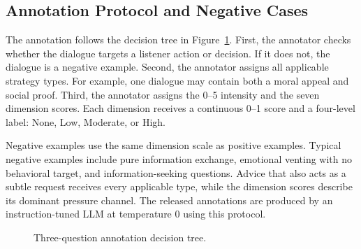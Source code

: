 \documentclass[conference]{IEEEtran}
\begin{document}
\subsection{Annotation Protocol and Negative Cases}
The annotation follows the decision tree in Figure~\ref{fig:tree}. First,
the annotator checks whether the dialogue targets a listener action or
decision. If it does not, the dialogue is a negative example. Second, the
annotator assigns all applicable strategy types. For example, one dialogue may
contain both a moral appeal and social proof. Third, the annotator assigns the
0--5 intensity and the seven dimension scores. Each dimension receives a
continuous 0--1 score and a four-level label: None, Low, Moderate, or High.

Negative examples use the same dimension scale as positive examples. Typical
negative examples include pure information exchange, emotional venting with
no behavioral target, and information-seeking questions. Advice that also
acts as a subtle request receives every applicable type, while the dimension
scores describe its dominant pressure channel. The released annotations are
produced by an instruction-tuned LLM at temperature 0 using this protocol.

\begin{figure}[t]
\centering
{}
\caption{Three-question annotation decision tree.}
\label{fig:tree}
\end{figure}
\end{document}
